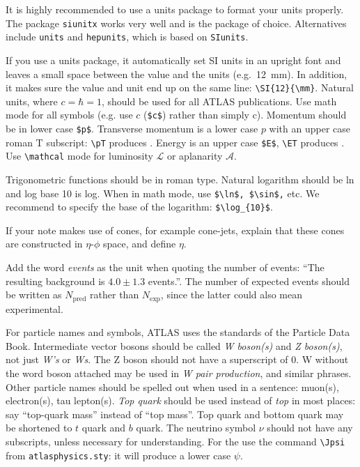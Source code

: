 \documentclass[PAPER,UKenglish,texlive=2016]{\ATLASLATEXPATH atlasdoc}
\begin{document}
It is highly recommended to use a units package to format your units properly.
The package \texttt{siunitx} works very well and is the package of choice.
Alternatives include \texttt{units} and \texttt{hepunits},
which is based on \texttt{SIunits}.

If you use a units package, it automatically set SI units in an upright font
and leaves a small space between
the value and the units (e.g.\ \SI{12}{\mm}). 
In addition, it makes sure the value and unit end up on the same line: \verb|\SI{12}{\mm}|.
Natural units, where $c=\hbar=1$, should be used for all
ATLAS publications.
Use math mode for all symbols (e.g. use $c$ (\verb|$c$|) rather than simply c). 
Momentum should be in lower case \verb+$p$+. 
Transverse momentum is a lower case $p$ with an upper case roman $\text{T}$ subscript: 
\verb|\pT| produces \pT.
Energy is an upper case \verb+$E$+, \verb+\ET+ produces \ET.  
Use \verb|\mathcal| mode for luminosity $\mathcal{L}$ or aplanarity
$\mathcal{A}$.

Trigonometric functions should be in roman type. Natural logarithm
should be ln and log base 10 is log.  When in math mode, use
\verb+$\ln$, $\sin$,+ etc. We recommend to specify the base of the
logarithm: \verb+$\log_{10}$+.

If your note makes use of cones, for example cone-jets, explain that
these cones are constructed in $\eta$-$\phi$ space, and define $\eta$.

Add the word \emph{events} as the unit when quoting the number of
events: \enquote{The resulting background is $4.0 \pm 1.3$ events.}.  The
number of expected events should be written as $N_{\text{pred}}$ rather
than $N_{\text{exp}}$, since the latter could also mean experimental.

For particle names and symbols, ATLAS uses the standards of the
Particle Data Book. Intermediate vector bosons should be called
\emph{W boson(s)} and \emph{Z boson(s)}, not just \emph{W's} or
\emph{Ws}. The Z boson should not have a superscript of 0. W without
the word boson attached may be used in \emph{W pair production}, and
similar phrases.  Other particle names should be spelled out when used
in a sentence: muon(s), electron(s), tau lepton(s). \emph{Top quark}
should be used instead of \emph{top} in most places: 
say \enquote{top-quark mass} instead of \enquote{top mass}.
Top quark and bottom quark may be shortened to $t$ quark and $b$ quark. 
The neutrino symbol $\nu$ should not have any subscripts, unless necessary for
understanding.
For the \Jpsi{} use the command \verb+\Jpsi+ from 
\texttt{atlasphysics.sty}: it will produce a lower case $\psi$.
\end{document}

